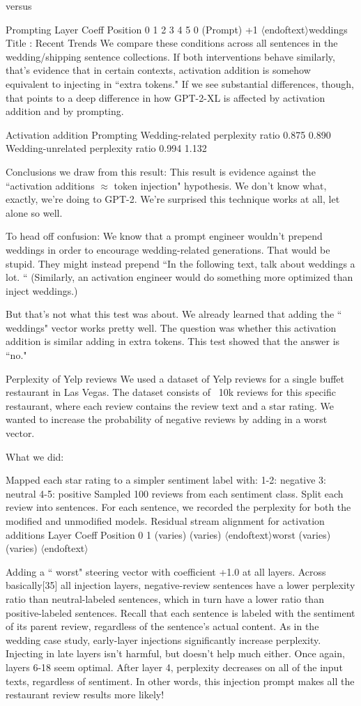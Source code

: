 \documentclass[10pt]{article}
\newcommand{\eot}{$\langle$\textbar endoftext\textbar$\rangle$}
\begin{document}
versus

Prompting
Layer	Coeff	Position 0	1	2	3	4	5
0 (Prompt)	+1	\eot	 weddings	Title	:	 Recent	 Trends
We compare these conditions across all sentences in the wedding/shipping sentence collections. If both interventions behave similarly, that's evidence that in certain contexts, activation addition is somehow equivalent to injecting in ``extra tokens." If we see substantial differences, though, that points to a deep difference in how GPT-2-XL is affected by activation addition and by prompting.

 	Activation addition	Prompting
Wedding-related perplexity ratio	
0.875
0.890
Wedding-unrelated perplexity ratio	
0.994
1.132

Conclusions we draw from this result: This result is evidence against the ``activation additions $\approx$ token injection" hypothesis. We don't know what, exactly, we're doing to GPT-2. We're surprised this technique works at all, let alone so well. 

To head off confusion: We know that a prompt engineer wouldn't prepend  weddings in order to encourage wedding-related generations. That would be stupid. They might instead prepend ``In the following text, talk about weddings a lot. `` (Similarly, an activation engineer would do something more optimized than inject  weddings.)

But that's not what this test was about. We already learned that adding the `` weddings" vector works pretty well. The question was whether this activation addition is similar adding in extra tokens. This test showed that the answer is ``no."

Perplexity of Yelp reviews
We used a dataset of Yelp reviews for a single buffet restaurant in Las Vegas. The dataset consists of ~10k reviews for this specific restaurant, where each review contains the review text and a star rating. We wanted to increase the probability of negative reviews by adding in a  worst vector.

What we did:

Mapped each star rating to a simpler sentiment label with:
1-2: negative
3: neutral
4-5: positive
Sampled 100 reviews from each sentiment class.
Split each review into sentences.
For each sentence, we recorded the perplexity for both the modified and unmodified models.
Residual stream alignment for activation additions
Layer	Coeff	Position 0	1
(varies)	(varies)	\eot	 worst
(varies)	(varies)	\eot	 

Adding a `` worst" steering vector with coefficient +1.0 at all layers.
Across basically[35] all injection layers, negative-review sentences have a lower perplexity ratio than neutral-labeled sentences, which in turn have a lower ratio than positive-labeled sentences. 
Recall that each sentence is labeled with the sentiment of its parent review, regardless of the sentence's actual content.
As in the wedding case study, early-layer injections significantly increase perplexity. Injecting in late layers isn't harmful, but doesn't help much either. Once again, layers 6-18 seem optimal.
After layer 4, perplexity decreases on all of the input texts, regardless of sentiment. In other words, this injection prompt makes all the restaurant review results more likely!
\end{document}
